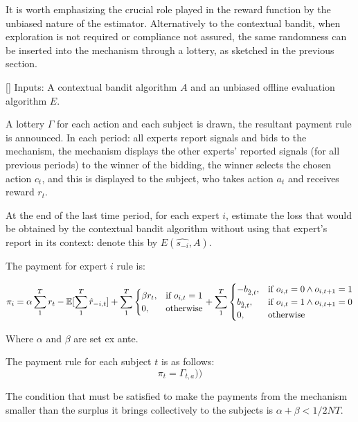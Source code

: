 It is worth emphasizing the crucial role played in the reward function by the unbiased nature of the estimator.
Alternatively to the contextual bandit, when exploration is not required or compliance not assured, the same randomness can be inserted into the mechanism through a lottery, as sketched in the previous section.


\begin{mech}\label{mech:bidbandit}[]
Inputs: A contextual bandit algorithm $A$ and an unbiased offline evaluation algorithm $E$.


A lottery $\Gamma$ for each action and each subject is drawn, the resultant payment rule is announced.
In each period: all experts report signals and bids to the mechanism, the mechanism displays the other experts' reported signals (for all previous periods) to the winner of the bidding, the winner selects the chosen action $c_t$, and this is displayed to the subject, who takes action $a_t$ and receives reward $r_t$.

At the end of the last time period, for each expert $i$, estimate the loss that would be obtained by the contextual bandit algorithm without using that expert's report in its context: denote this by $E(\hat{s_{-i}},A)$.

The payment for expert $i$ rule is:

\[
    \pi_i = 
\alpha \sum_1^T r_t -  \expec[\sum_1^T \hat{r}_{-i,t}]
+
\sum_1^T
\begin{cases}
    \beta r_t ,& \text{if } o_{i,t} = 1\\
     0,              & \text{otherwise}
\end{cases}
+
\sum_1^T
\begin{cases}
     - b_{\hat{2},t} ,& \text{if } o_{i,t} = 0 \land o_{i,t+1} = 1\\
       b_{\hat{2},t} ,& \text{if } o_{i,t} = 1 \land o_{i,t+1} = 0 \\
	   0,              & \text{otherwise}
\end{cases}
\]

Where $\alpha$ and $\beta$ are set ex ante. 


The payment rule for each subject $t$ is as follows:
\[
    \pi_t =  \Gamma_{t,a}))
\]

\end{mech}


The condition that must be satisfied to make the payments from the mechanism smaller than the surplus it brings collectively to the subjects is $ \alpha + \beta < 1/2NT$.


